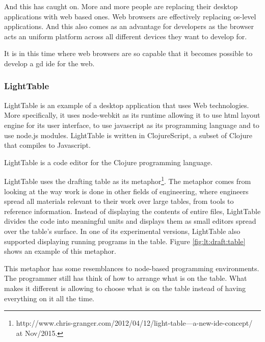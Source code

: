 \documentclass{./llncs2e/llncs}
\begin{document}
	And this has caught on.
	More and more people are replacing their desktop applications with web based ones.
	Web browsers are effectively replacing \ac{os}-level applications.
	And this also comes as an advantage for developers as the browser acts an uniform platform across all different devices they want to develop for.

	It is in this time where web browsers are so capable that it becomes possible to develop a \ac{gd} \ac{ide} for the web.

\subsubsection{LightTable}
	LightTable is an example of a desktop application that uses Web technologies.
	More specifically, it uses node-webkit as its runtime allowing it to use html layout engine for its user interface, to use javascript as its programming language and to use node.js\cite{tilkov2010node} modules.
	LightTable is written in ClojureScript\cite{10.1109/MIC.2011.148}, a subset of Clojure that compiles to Javascript.

	LightTable is a code editor for the Clojure programming language\cite{hickey2008clojure}. 


	LightTable uses the drafting table as its metaphor\footnote{http://www.chris-granger.com/2012/04/12/light-table---a-new-ide-concept/ at Nov/2015.}. 
	The metaphor comes from looking at the way work is done in other fields of engineering, where engineers spread all materials relevant to their work over large tables, from tools to reference information. 
	Instead of displaying the contents of entire files, LightTable divides the code into meaningful units and displays them as small editors spread over the table's surface. 
	In one of its experimental versions, LightTable also supported displaying running programs in the table. 
	Figure \ref{fig:lt:draft:table} shows an example of this metaphor.

	This metaphor has some resemblances to node-based programming environments. 
	The programmer still has think of how to arrange what is on the table.
	What makes it different is allowing to choose what is on the table instead of having everything on it all the time.
\end{document}
